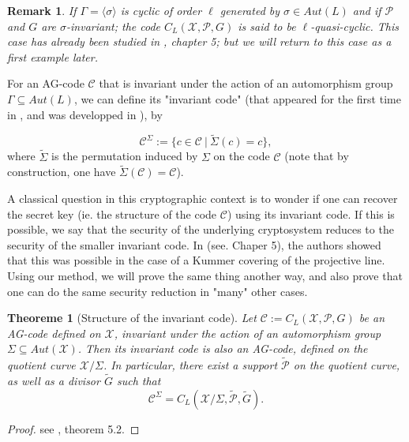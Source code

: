 \documentclass[10pt]{article}
\newtheorem{thm}{Theoreme}[]
\newtheorem{rq1}{Remark}[]
\newcommand{\s}{\vspace{0.3cm}}
\newcommand{\su}{\subseteq}
\newcommand{\X}{\mathcal{X}}
\newcommand{\PR}{\mathcal{P}}
\begin{document}
\s

\begin{rq1} \rm
If $\Gamma = \langle\sigma\rangle$ is cyclic of order $\ell$ generated by $\sigma \in Aut(L)$ and if $\PR$ and $G$ are $\sigma$-invariant; the code $C_L(\X,\PR,G)$ is said to be $\ell$-quasi-cyclic. This case has already been studied in \cite{Bar}, chapter 5; but we will return to this case as a first example later. 
\end{rq1}

\s

For an AG-code $\mathcal{C}$ that is invariant under the action of an automorphism group $\Gamma \su Aut(L)$, we can define its "invariant code" (that appeared for the first time in \cite{FOP}, and was developped in \cite{Bar}), by 

\[\mathcal{C}^{\Sigma} := \{c \in \mathcal{C} \ | \ \tilde{\Sigma}(c)=c\},\]
where $\tilde{\Sigma}$ is the permutation induced by $\Sigma$ on the code $\mathcal{C}$ (note that by construction, one have $\tilde{\Sigma}(\mathcal{C}) = \mathcal{C}$).

A classical question in this cryptographic context is to wonder if one can recover the secret key (ie. the structure of the code $\mathcal{C}$) using its invariant code. If this is possible, we say that the security of the underlying cryptosystem reduces to the security of the smaller invariant code. In \cite{Bar} (see. Chaper 5), the authors showed that this was possible in the case of a Kummer covering of the projective line. Using our method, we will prove the same thing another way, and also prove that one can do the same security reduction in "many" other cases.

\s

\begin{thm} [Structure of the invariant code]
Let $\mathcal{C} := C_L(\X,\PR,G)$ be an AG-code defined on $\X$, invariant under the action of an automorphism group $\Sigma \su Aut(\X)$. Then its invariant code is also an AG-code, defined on the quotient curve $\X/\Sigma$. In particular, there exist a support $\tilde{\PR}$ on the quotient curve, as well as a divisor $\tilde{G}$ such that
\[\mathcal{C}^{\Sigma} = C_L(\X/\Sigma,\tilde{\PR},\tilde{G}).\]
\end{thm}

\s
 
\begin{proof}
see \cite{Bar}, theorem 5.2.
\end{proof}

\s
\end{document}
